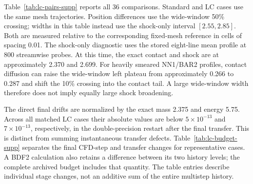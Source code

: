 \documentclass[11pt,a4paper]{article}
\begin{document}
Table~\ref{tab:lc-pairs-supp} reports all 36 comparisons. Standard and LC cases use the same mesh trajectories. Position differences use the wide-window 50\% crossing; widths in this table instead use the shock-only interval $[2.55,2.85]$. Both are measured relative to the corresponding fixed-mesh reference in cells of spacing 0.01. The shock-only diagnostic uses the stored eight-line mean profile at 800 streamwise probes. At this time, the exact contact and shock are at approximately 2.370 and 2.699. For heavily smeared NN1/BAR2 profiles, contact diffusion can raise the wide-window left plateau from approximately 0.266 to 0.287 and shift the 10\% crossing into the contact tail. A large wide-window width therefore does not imply equally large shock broadening.

\begin{table}[!htbp]
\centering\scriptsize
\caption{Matched standard and LC transfers. $\Delta n$ is the remeshing interval, $s$ the deformation parameter, and the last index column identifies the mesh sequence. Subscripts $\mathrm{std}$ and $\mathrm{LC}$ identify standard transfer and local flux correction; the superscript $\mathrm{shock}$ distinguishes these widths from the wide-window widths in Section S1. Positions and shock-only widths are in reference cells.}
\label{tab:lc-pairs-supp}
\end{table}
\FloatBarrier

The direct final drifts are normalized by the exact mass 2.375 and energy 5.75. Across all matched LC cases their absolute values are below $5\times10^{-13}$ and $7\times10^{-13}$, respectively, in the double-precision restart after the final transfer. This is distinct from summing instantaneous transfer defects. Table~\ref{tab:lc-budget-supp} separates the final CFD-step and transfer changes for representative cases. A BDF2 calculation also retains a difference between its two history levels; the complete archived budget includes that quantity. The table entries describe individual stage changes, not an additive sum of the entire multistep history.
\end{document}
